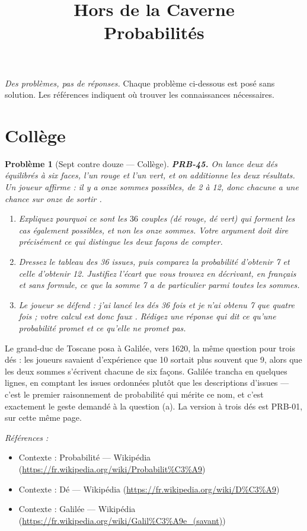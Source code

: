 \documentclass[11pt]{article}
\title{Hors de la Caverne \\ \Large Probabilités}
\author{}
\date{}
\newtheorem{problem}{Problème}
\newenvironment{refs}{\par\small\noindent\emph{Références :}\begin{itemize}\setlength\itemsep{0pt}}{\end{itemize}\normalsize}
\begin{document}
\maketitle
\noindent\emph{Des problèmes, pas de réponses.} Chaque problème ci-dessous est posé
sans solution. Les références indiquent où trouver les connaissances nécessaires.
\medskip


\section*{Collège}

\begin{problem}[{Sept contre douze --- Collège}]
\textbf{PRB-45.} On lance deux dés équilibrés à six faces, l'un rouge et l'un vert, et on
additionne les deux résultats. Un joueur affirme : \og{} il y a onze sommes possibles, de 2 à 12, donc
chacune a une chance sur onze de sortir \fg{}.
\begin{enumerate}
\item[(a)] Expliquez pourquoi ce sont les $ 36 $ couples (dé rouge, dé vert) qui forment les cas
également possibles, et non les onze sommes. Votre argument doit dire précisément ce qui distingue
les deux façons de compter.
\item[(b)] Dressez le tableau des 36 issues, puis comparez la probabilité d'obtenir 7 et celle d'obtenir
12. Justifiez l'écart que vous trouvez en décrivant, en français et sans formule, ce que la somme 7
a de particulier parmi toutes les sommes.
\item[(c)] Le joueur se défend : \og{} j'ai lancé les dés 36 fois et je n'ai obtenu 7 que quatre fois ; votre
calcul est donc faux \fg{}. Rédigez une réponse qui dit ce qu'une probabilité promet et ce qu'elle ne
promet pas.
\end{enumerate}

\end{problem}

\noindent Le grand-duc de Toscane posa à Galilée, vers 1620, la même question pour trois
dés : les joueurs savaient d'expérience que 10 sortait plus souvent que 9, alors que les deux
sommes s'écrivent chacune de six façons. Galilée trancha en quelques lignes, en comptant les issues
ordonnées plutôt que les descriptions d'issues --- c'est le premier raisonnement de probabilité qui
mérite ce nom, et c'est exactement le geste demandé à la question (a). La version à trois dés est
PRB-01, sur cette même page.

\begin{refs}
\item Contexte : Probabilité --- Wikipédia (\url{https://fr.wikipedia.org/wiki/Probabilit%C3%A9})
\item Contexte : Dé --- Wikipédia (\url{https://fr.wikipedia.org/wiki/D%C3%A9})
\item Contexte : Galilée --- Wikipédia (\url{https://fr.wikipedia.org/wiki/Galil%C3%A9e_(savant)})
\end{refs}
\end{document}
